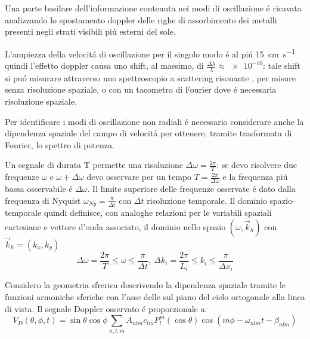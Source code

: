 \documentclass[../main.tex]{subfiles}
\begin{document}
Una parte basilare dell'informazione contenuta nei modi di oscillazione \'e ricavata analizzando  lo spostamento doppler delle righe di assorbimento dei metalli presenti negli strati visibili pi\'u esterni del sole.

L'ampiezza della velocit\'a di oscillazione per il singolo modo \'e  al pi\'u \SI{15}{\cm\per\second} quindi l'effetto doppler causa uno shift, al massimo, di $\frac{\Delta\lambda}{\lambda}\approx\num{e-10}$: tale shift si pu\'o misurare attraverso uno spettroscopio a scattering risonante  , per misure senza risoluzione spaziale, o con un tacometro di Fourier dove \'e necessaria risoluzione spaziale.


Per identificare i modi di oscillazione non radiali \'e necessario considerare anche la dipendenza spaziale del campo di velocit\'a per ottenere, tramite trasformata di Fourier, lo spettro di potenza.

Un segnale di durata T permette una risoluzione $\Delta\omega=\frac{2\pi}{T}$: se devo risolvere due frequenze $\omega$ e $\omega+\Delta\omega$ devo osservare per un tempo $T=\frac{2\pi}{\Delta\omega}$ e la frequenza pi\'u bassa osservabile \'e $\Delta\omega$. Il limite superiore delle frequenze osservate \'e dato dalla frequenza di Nyquist $\omega_{Ny}=\frac{\pi}{\Delta t}$ con $\Delta t$ risoluzione temporale. Il dominio spazio-temporale quindi definisce, con analoghe relazioni per le variabili spaziali cartesiane e vettore d'onda associato, il dominio nello spazio $(\omega,\vec{k}_h)$ con $\vec{k}_h=(k_x,k_y)$
\begin{equation}
\Delta\omega=\frac{2\pi}{T}\leq\omega\leq\frac{\pi}{\Delta t},\ \Delta k_i=\frac{2\pi}{L_i}\leq k_i\leq\frac{\pi}{\Delta x_i}
\end{equation}

Considero la geometria sfrerica descrivendo la dipendenza spaziale tramite le funzioni armoniche sferiche con l'asse delle sul piano del cielo ortogonale alla linea di vista. Il segnale Doppler osservato \'e proporzionale a:
\begin{equation}
    V_D(\theta,\phi,t)=\sin{\theta}\cos{\phi}\sum_{n,l,m}A_{nlm}c_{lm}P_l^m(\cos{\theta})\cos{(m\phi-\omega_{nlm}t-\beta_{nlm})}
\end{equation}
\end{document}
